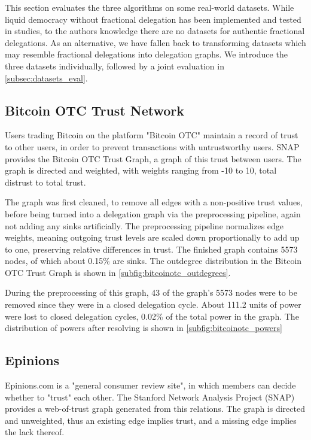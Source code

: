 This section evaluates the three algorithms on some real-world datasets. While liquid democracy without fractional delegation has been implemented and tested in studies, to the authors knowledge there are no datasets for authentic fractional delegations. As an alternative, we have fallen back to transforming datasets which may resemble fractional delegations into delegation graphs. We  introduce the three datasets individually, followed by a joint evaluation in \cref{subsec:datasets_eval}.

\subsection{Bitcoin OTC Trust Network}

Users trading Bitcoin on the platform "Bitcoin OTC" maintain a record of trust to other users, in order to prevent transactions with untrustworthy users. SNAP provides the Bitcoin OTC Trust Graph, a graph of this trust between users. \cite{kumar2016edge, kumar2018rev2} The graph is directed and weighted, with weights ranging from -10 to 10, total distrust to total trust. 

The graph was first cleaned, to remove all edges with a non-positive trust values, before being turned into a delegation graph via the preprocessing pipeline, again not adding any sinks artificially. The preprocessing pipeline normalizes edge weights, meaning outgoing trust levels are scaled down proportionally to add up to one, preserving relative differences in trust. The finished graph contains 5573 nodes, of which about 0.15\% are sinks. The outdegree distribution in the Bitcoin OTC Trust Graph is shown in \cref{subfig:bitcoinotc_outdegrees}.

During the preprocessing of this graph, 43 of the graph's 5573 nodes were to be removed since they were in a closed delegation cycle. About 111.2 units of power were lost to closed delegation cycles,  0.02\% of the total power in the graph. The distribution of powers after resolving is shown in \cref{subfig:bitcoinotc_powers}

\subsection{Epinions}

Epinions.com is a "general consumer review site", in which members can decide whether to "trust" each other. The Stanford Network Analysis Project (SNAP) provides a web-of-trust graph generated from this relations. \cite{richardsonTrustManagementSemantic2003} The graph is directed and unweighted, thus an existing edge implies trust, and a missing edge implies the lack thereof.

